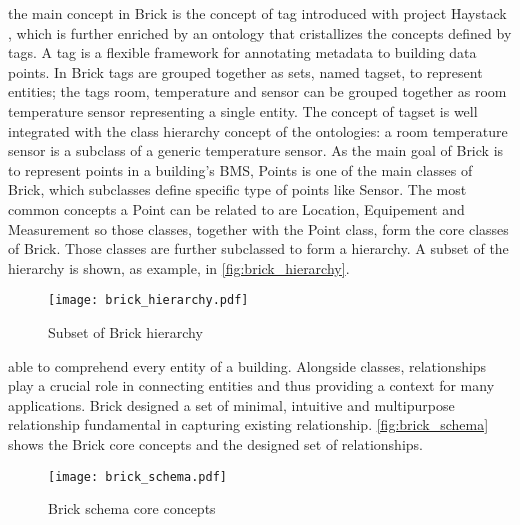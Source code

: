 the main concept in Brick is the concept of tag introduced with project Haystack \cite{project_haystack}, which is further enriched by an ontology that cristallizes the concepts defined by tags. A tag is a flexible framework for annotating metadata to building data points. In Brick tags are grouped together as sets, named tagset, to represent entities; the tags {room}, {temperature} and {sensor} can be grouped together as {room temperature sensor} representing a single entity. The concept of tagset is well integrated with the class hierarchy concept of the ontologies: a {room temperature sensor} is a subclass of a generic {temperature sensor}.
As the main goal of Brick is to represent points in a building's BMS, Points is one of the main classes of Brick, which subclasses define specific type of points like Sensor. The most common concepts a Point can be related to are Location, Equipement and Measurement so those classes, together with the Point class, form the core classes of Brick. Those classes are further subclassed to form a hierarchy. A subset of the hierarchy is shown, as example, in \autoref{fig:brick_hierarchy}.
\begin{figure}
  \centering
  \texttt{[image: brick\_hierarchy.pdf]}
  \caption{Subset of Brick hierarchy}
  \label{fig:brick_hierarchy}
\end{figure}
able to comprehend every entity of a building. Alongside classes, relationships play a crucial role in connecting entities and thus providing a context for many applications. Brick designed a set of minimal, intuitive and multipurpose relationship fundamental in capturing existing relationship. \autoref{fig:brick_schema} shows the Brick core concepts and the designed set of relationships.

\begin{figure}
  \centering
  \texttt{[image: brick\_schema.pdf]}
  \caption{Brick schema core concepts}
  \label{fig:brick_schema}
\end{figure}


